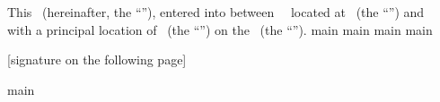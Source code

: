 This \amendmentTitle\ (hereinafter, the “\amendmentTitle”), entered into between \lessorName\, \lessorType\, located at \lessorAddress\ (the “\lessor”) and \lesseeName\, \lesseeType\, with a principal location of \lesseeAddress\ (the “\lessee”) on the \effectiveDateText\ (the “\effectiveDate”).
\newline
{main}
\newline
{main}
\newline
{main}
\newline
{main}
\newline
\newline
\newline
\begin{center}
[signature on the following page]
\end{center}
\newpage
{main}
